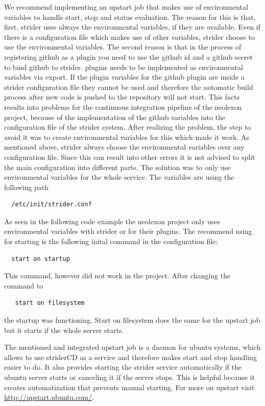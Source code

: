 We recommend implementing an upstart job that makes use of environmental variables to handle start, stop and status evaluation.
The reason for this is that, first, strider uses always the environmental variables, if they are available. Even if there is a configuration
file which makes use of other variables, strider choose to use the environmental variables. The second reason is that in the process of
registering github as a plugin you need to use the github id and a github secret to bind github to strider. plugins needs to be implemented
as environmental variables via export. If the plugin variables for the github plugin are inside a strider configuration file they cannot
be used and therefore the automatic build process after new code is pushed to the repository will not start. This facts results into problems
for the continuous integration pipeline of the neolexon project, because of the implementation of the github variables into the configuration
file of the strider system. After realizing the problem, the step to avoid it was to create environmental variables for this which made it work.
As mentioned above, strider always choose the environmental variables over any configuration file. Since this can result into other errors
it is not advised to split the main configuration into different parts. The solution was to only use environmental variables for the whole service.
The variables are using the following path

\begin{lstlisting}
  /etc/init/strider.conf
\end{lstlisting}

As seen in the following code example the neolexon project only uses environmental variables with strider or for their plugins. The recommend using
for starting is the following inital command in the configuration file:
\begin{lstlisting}
  start on startup
\end{lstlisting}
 This command, however did not work in the project. After changing the command to
 \begin{lstlisting}
   start on filesystem
 \end{lstlisting}
  the startup was functioning.
  Start on filesystem does the same for the upstart job but it starts if the whole server starts.



The mentioned and integrated upstart job is a daemon for ubuntu systems, which allows to use striderCD as a service and therefore makes start and
stop handling easier to do. It also provides starting the strider service automatically if the ubuntu server starts or canceling it if the server
stops. This is helpful because it creates automatization that prevents manual starting. For more on upstart visit \url{http://upstart.ubuntu.com/}.


